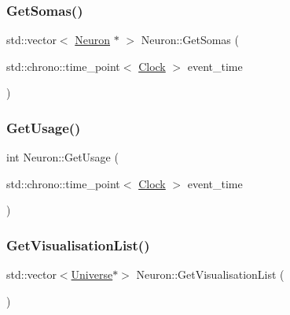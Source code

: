 \mbox{\label{classNeuron_a867fbd498b54c115a2c8769f83c48020}} 
\subsubsection{\texorpdfstring{Get\+Somas()}{GetSomas()}}
{\footnotesize\ttfamily std\+::vector$<$ \mbox{\hyperlink{classNeuron}{Neuron}} $\ast$ $>$ Neuron\+::\+Get\+Somas (\begin{DoxyParamCaption}\item[{std\+::chrono\+::time\+\_\+point$<$ \mbox{\hyperlink{universe_8h_a0ef8d951d1ca5ab3cfaf7ab4c7a6fd80}{Clock}} $>$}]{event\+\_\+time }\end{DoxyParamCaption})}

\mbox{\label{classNeuron_a745b090da1b8f8fc7e3cf0ca06dfb117}} 
\subsubsection{\texorpdfstring{Get\+Usage()}{GetUsage()}}
{\footnotesize\ttfamily int Neuron\+::\+Get\+Usage (\begin{DoxyParamCaption}\item[{std\+::chrono\+::time\+\_\+point$<$ \mbox{\hyperlink{universe_8h_a0ef8d951d1ca5ab3cfaf7ab4c7a6fd80}{Clock}} $>$}]{event\+\_\+time }\end{DoxyParamCaption})\hspace{0.3cm}{\ttfamily [inline]}}

\mbox{\label{classNeuron_a9af31418d1232135bf5074f6a3d5dbf1}} 
\subsubsection{\texorpdfstring{Get\+Visualisation\+List()}{GetVisualisationList()}}
{\footnotesize\ttfamily std\+::vector$<$\mbox{\hyperlink{classUniverse}{Universe}}$\ast$$>$ Neuron\+::\+Get\+Visualisation\+List (\begin{DoxyParamCaption}{ }\end{DoxyParamCaption})\hspace{0.3cm}{\ttfamily [inline]}}

